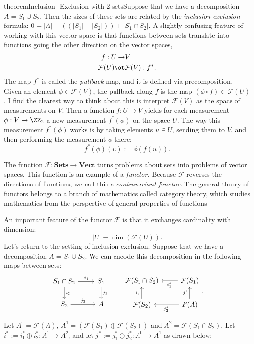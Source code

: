 \begin{doubledpage}{theorem}{Inclusion- Exclusion with 2 sets}{Suppose that we have a decomposition $A=S_1\cup S_2$. Then the sizes of these sets are related by the \emph{inclusion-exclusion} formula: $0=|A| -(\left(|S_1|+|S_2|\right))+|S_1\cap S_2|.$}
A slightly confusing feature of working with this vector space is that functions between sets translate into functions going the other direction on the vector spaces,
\begin{align*}
	f: U\to&V\\
	\mathcal F(U)\ot& \mathcal F(V):f^*.
\end{align*}
The map $f^*$ is called the \emph{pullback} map, and it is defined via precomposition. Given an element $\phi\in \mathcal F(V)$, the pullback along $f$ is the map $(\phi \circ f)\in \mathcal F(U)$. 
I find the clearest way to think about this is interpret $\mathcal F(V)$ as the space of measurements on $V$. 
Then a function $f: U\to V$ yields for each measurement $\phi: V\to \ZZ_2$ a new measurement $f^*(\phi)$ on the space $U$. 
The way this measurement $f^*(\phi)$ works is by taking elements $u\in U$, sending them to $V$, and then performing the measurement $\phi$ there:
\[f^*(\phi)(u):=\phi(f(u)).\]
\begin{remark}
	The function $\mathcal F: \textbf{Sets}\to \textbf{Vect}$ turns problems about sets into problems of vector spaces. This function is an example of a \emph{functor.} 
	Because $\mathcal F$ reverses the directions of functions, we call this a \emph{contravariant functor.} 
	The general theory of functors belongs to a branch of mathematics called category theory, which studies mathematics from the perspective of general properties of functions. 
\end{remark}
An important feature of the functor $\mathcal F$ is that it exchanges cardinality with dimension: 
\[
	|U|=\dim(\mathcal F(U)).
\]
Let's return to the setting of inclusion-exclusion.
Suppose that we have a decomposition $A=S_1\cup S_2$.
We can encode this decomposition in the following maps between sets:
\[
\begin{tikzcd}
  S_1\cap S_2 \arrow{r}{i_1} \arrow{d}{i_2} & S_1\arrow{d}{j_1} \\
  S_2\arrow{r}{j_2} & A
\end{tikzcd}\;\;\;\;\;\;\;
\begin{tikzcd}
	\mathcal F(S_1\cap S_2 ) &  \mathcal F(S_1) \arrow{l}{i_1^*}\\
	\mathcal F(S_2) \arrow{u}{i_2^*} & \mathcal \mathcal F(A) \arrow{u}{j_1^*} \arrow{l}{j_2^*}
\end{tikzcd}.		
\]
\newpage
\begin{theorem} 
	Let $A^0=\mathcal F(A)$, $A^1=(\mathcal F(S_1)\oplus \mathcal F(S_2))$ and $A^2=\mathcal F(S_1\cap S_2)$.
	Let $i^*:= i_1^*\oplus i_2^*: A^1\to A^2$, and let $j^*:= j_1^*\oplus j_2^*: A^0\to A^1$ as drawn below:

\end{theorem}
\end{doubledpage}
